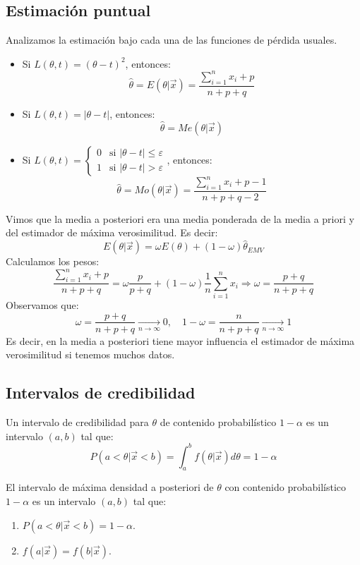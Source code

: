 \subsection*{Estimación puntual}
Analizamos la estimación bajo cada una de las funciones de pérdida usuales.
\begin{itemize}
    \item Si $L(\theta, t) = (\theta-t)^2$, entonces:
          $$\hat{\theta} = E(\theta|\vec{x}) = \frac{\sum_{i=1}^n x_i + p}{n+p+q}$$
    \item Si $L(\theta, t) = |\theta-t|$, entonces:
          $$\hat{\theta} = Me(\theta|\vec{x})$$
    \item Si $L(\theta, t) = \begin{cases}
                  0 & \text{si } |\theta-t| \leq \varepsilon \\
                  1 & \text{si } |\theta-t| > \varepsilon
              \end{cases}$, entonces:
          $$\hat{\theta} = Mo(\theta|\vec{x}) = \frac{\sum_{i=1}^n x_i + p-1}{n+p+q-2}$$
\end{itemize}

Vimos que la media a posteriori era una media ponderada de la media a priori y del estimador de máxima verosimilitud.
Es decir:
$$E(\theta|\vec{x}) = \omega E(\theta) + (1-\omega)\hat{\theta}_{EMV}$$
Calculamos los pesos:
$$\frac{\sum_{i=1}^n x_i + p}{n+p+q} = \omega\frac{p}{p+q} + (1-\omega)\frac{1}{n}\sum_{i=1}^n x_i \Rightarrow \omega = \frac{p+q}{n+p+q}$$
Observamos que:
$$\omega = \frac{p+q}{n+p+q} \xrightarrow[n \to \infty]{} 0,  \quad 1-\omega = \frac{n}{n+p+q} \xrightarrow[n \to \infty]{} 1$$
Es decir, en la media a posteriori tiene mayor influencia el estimador de máxima verosimilitud si tenemos muchos datos.

\subsection*{Intervalos de credibilidad}
Un intervalo de credibilidad para $\theta$ de contenido probabilístico $1-\alpha$ es un intervalo $(a, b)$ tal que:
$$P(a < \theta|\vec{x} < b) = \int_a^b f(\theta|\vec{x})d\theta = 1-\alpha$$

El intervalo de máxima densidad a posteriori de $\theta$ con contenido probabilístico $1-\alpha$ es un intervalo $(a, b)$ tal que:
\begin{enumerate}
    \item $P(a < \theta|\vec{x} < b) = 1-\alpha$.
    \item $f(a|\vec{x}) = f(b|\vec{x})$.
\end{enumerate}

